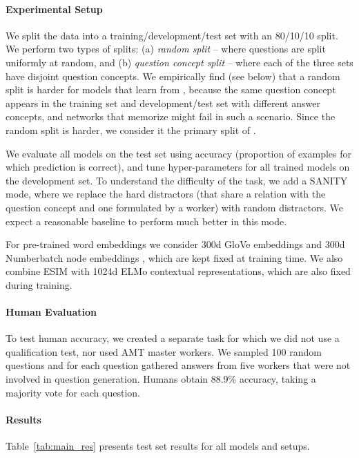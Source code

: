 \paragraph{Experimental Setup} We split the data into a training/development/test set with an 80/10/10 split. We perform two types of splits: (a) \emph{random split} --  where questions are split uniformly at random, and (b) \emph{question concept split} -- where each of the three sets have disjoint question concepts. We empirically find (see below) that a random split is harder for models that learn from \csqa{}, because the same question concept appears in the training set and development/test set with different answer concepts, and networks that memorize might fail in such a scenario. Since the random split is harder, we consider it the primary split of \csqa{}.

We evaluate all models on the test set using accuracy (proportion of examples for which prediction is correct), and tune hyper-parameters for all trained models on the development set. To understand the difficulty of the task, we add a SANITY mode, where we replace the hard distractors (that share a relation with the question concept and one formulated by a worker) with random \conceptnet{} distractors. We expect a reasonable baseline to perform much better in this mode.

For pre-trained word embeddings we consider 300d GloVe embeddings \cite{pennington2014glove} and 300d Numberbatch \conceptnet{} node embeddings \cite{speer2017conceptnet}, which are kept fixed at training time. We also combine \textsc{ESIM} with 1024d ELMo contextual representations, which are also fixed during training.

\paragraph{Human Evaluation} To test human accuracy, we created a separate task for which we did not use a qualification test, nor used AMT master workers. We sampled 100 random questions and for each question gathered answers from five workers that were not involved in question generation. Humans obtain 88.9\% accuracy, taking a majority vote for each question.

\paragraph{Results}
Table~\ref{tab:main_res} presents test set results for all models and setups.

